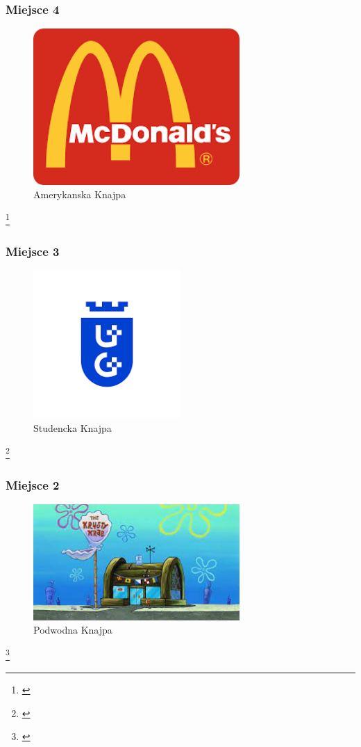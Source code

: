 \documentclass{beamer}
\begin{document}
\begin{frame}
\frametitle{Miejsce 4}
    \begin{figure}
        \includegraphics[width=0.7\textwidth]{mc.png}
        \caption{Amerykanska Knajpa}
    \end{figure}
    \footnote{\cite{knajpa2}}
\end{frame}

\begin{frame}
\frametitle{Miejsce 3}
    \begin{figure}
        \includegraphics[width=0.5\textwidth]{ug.png}
        \caption{Studencka Knajpa}
    \end{figure}
    \footnote{\cite{knajpa3}}
\end{frame}

\begin{frame}
\frametitle{Miejsce 2}
    \begin{figure}
        \includegraphics[width=0.7\textwidth]{krab.jpeg}
        \caption{Podwodna Knajpa}
    \end{figure}
    \footnote{\cite{knajpa4}}
\end{frame}
\end{document}
